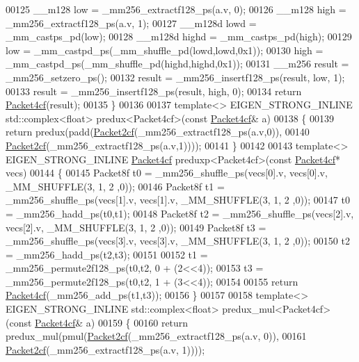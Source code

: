 \begin{DoxyCode}
00125   \_\_m128 low  = \_mm256\_extractf128\_ps(a.v, 0);
00126   \_\_m128 high = \_mm256\_extractf128\_ps(a.v, 1);
00127   \_\_m128d lowd  = \_mm\_castps\_pd(low);
00128   \_\_m128d highd = \_mm\_castps\_pd(high);
00129   low  = \_mm\_castpd\_ps(\_mm\_shuffle\_pd(lowd,lowd,0x1));
00130   high = \_mm\_castpd\_ps(\_mm\_shuffle\_pd(highd,highd,0x1));
00131   \_\_m256 result = \_mm256\_setzero\_ps();
00132   result = \_mm256\_insertf128\_ps(result, low, 1);
00133   result = \_mm256\_insertf128\_ps(result, high, 0);
00134   \textcolor{keywordflow}{return} \hyperlink{struct_eigen_1_1internal_1_1_packet4cf}{Packet4cf}(result);
00135 \}
00136 
00137 \textcolor{keyword}{template}<> EIGEN\_STRONG\_INLINE std::complex<float> predux<Packet4cf>(\textcolor{keyword}{const} 
      \hyperlink{struct_eigen_1_1internal_1_1_packet4cf}{Packet4cf}& a)
00138 \{
00139   \textcolor{keywordflow}{return} predux(padd(\hyperlink{struct_eigen_1_1internal_1_1_packet2cf}{Packet2cf}(\_mm256\_extractf128\_ps(a.v,0)),
00140                      \hyperlink{struct_eigen_1_1internal_1_1_packet2cf}{Packet2cf}(\_mm256\_extractf128\_ps(a.v,1))));
00141 \}
00142 
00143 \textcolor{keyword}{template}<> EIGEN\_STRONG\_INLINE \hyperlink{struct_eigen_1_1internal_1_1_packet4cf}{Packet4cf} preduxp<Packet4cf>(\textcolor{keyword}{const} 
      \hyperlink{struct_eigen_1_1internal_1_1_packet4cf}{Packet4cf}* vecs)
00144 \{
00145   Packet8f t0 = \_mm256\_shuffle\_ps(vecs[0].v, vecs[0].v, \_MM\_SHUFFLE(3, 1, 2 ,0));
00146   Packet8f t1 = \_mm256\_shuffle\_ps(vecs[1].v, vecs[1].v, \_MM\_SHUFFLE(3, 1, 2 ,0));
00147   t0 = \_mm256\_hadd\_ps(t0,t1);
00148   Packet8f t2 = \_mm256\_shuffle\_ps(vecs[2].v, vecs[2].v, \_MM\_SHUFFLE(3, 1, 2 ,0));
00149   Packet8f t3 = \_mm256\_shuffle\_ps(vecs[3].v, vecs[3].v, \_MM\_SHUFFLE(3, 1, 2 ,0));
00150   t2 = \_mm256\_hadd\_ps(t2,t3);
00151   
00152   t1 = \_mm256\_permute2f128\_ps(t0,t2, 0 + (2<<4));
00153   t3 = \_mm256\_permute2f128\_ps(t0,t2, 1 + (3<<4));
00154 
00155   \textcolor{keywordflow}{return} \hyperlink{struct_eigen_1_1internal_1_1_packet4cf}{Packet4cf}(\_mm256\_add\_ps(t1,t3));
00156 \}
00157 
00158 \textcolor{keyword}{template}<> EIGEN\_STRONG\_INLINE std::complex<float> predux\_mul<Packet4cf>(\textcolor{keyword}{const} 
      \hyperlink{struct_eigen_1_1internal_1_1_packet4cf}{Packet4cf}& a)
00159 \{
00160   \textcolor{keywordflow}{return} predux\_mul(pmul(\hyperlink{struct_eigen_1_1internal_1_1_packet2cf}{Packet2cf}(\_mm256\_extractf128\_ps(a.v, 0)),
00161                          \hyperlink{struct_eigen_1_1internal_1_1_packet2cf}{Packet2cf}(\_mm256\_extractf128\_ps(a.v, 1))));

\end{DoxyCode}
